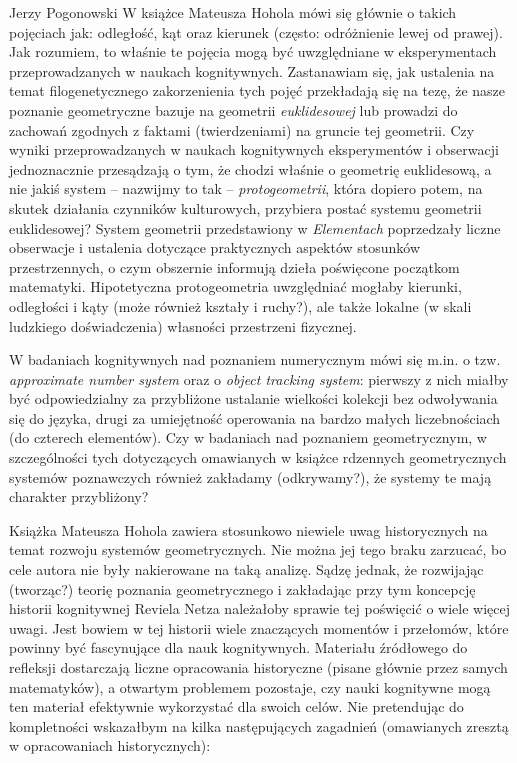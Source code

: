 \begin{newrevengenv}{Jerzy Pogonowski}
W książce Mateusza Hohola mówi się głównie o takich pojęciach jak:
odległość, kąt oraz kierunek (często: odróżnienie lewej od
prawej). Jak rozumiem, to właśnie te pojęcia mogą być uwzględniane
w eksperymentach przeprowadzanych w naukach kognitywnych.
Zastanawiam się, jak ustalenia na temat filogenetycznego
zakorzenienia tych pojęć przekładają się na tezę, że nasze
poznanie geometryczne bazuje na geometrii {\em euklidesowej} lub
prowadzi do zachowań zgodnych z faktami (twierdzeniami) na gruncie
tej geometrii. Czy wyniki przeprowadzanych w naukach kognitywnych
eksperymentów i obserwacji jednoznacznie przesądzają o tym, że
chodzi właśnie o geometrię euklidesową, a nie jakiś system --
nazwijmy to tak -- {\em protogeometrii}, która dopiero potem, na
skutek działania czynników kulturowych, przybiera postać systemu
geometrii euklidesowej? System geometrii przedstawiony w {\em
Elementach} poprzedzały liczne obserwacje i ustalenia dotyczące
praktycznych aspektów stosunków przestrzennych, o czym obszernie
informują dzieła poświęcone początkom matematyki. Hipotetyczna
protogeometria uwzględniać mogłaby kierunki, odległości i kąty
(może również kształy i ruchy?), ale także lokalne (w skali
ludzkiego doświadczenia) własności przestrzeni fizycznej.

W badaniach kognitywnych nad poznaniem numerycznym mówi się m.in.
o tzw. {\em approximate number system} oraz o {\em object tracking
system}: pierwszy z nich miałby być odpowiedzialny za przybliżone
ustalanie wielkości kolekcji bez odwoływania się do języka, drugi
za umiejętność operowania na bardzo małych liczebnościach (do
czterech elementów). Czy w badaniach nad poznaniem geometrycznym,
w szczególności tych dotyczących omawianych w książce rdzennych
geometrycznych systemów poznawczych również zakładamy
(odkrywamy?), że systemy te mają charakter przybliżony?

Książka Mateusza Hohola zawiera stosunkowo niewiele uwag
historycznych na temat rozwoju systemów geometrycznych. Nie można
jej tego braku zarzucać, bo cele autora nie były nakierowane na
taką analizę. Sądzę jednak, że rozwijając (tworząc?) teorię
poznania geometrycznego i zakładając przy tym koncepcję historii
kognitywnej Reviela Netza należałoby sprawie tej poświęcić o wiele
więcej uwagi. Jest bowiem w tej historii wiele znaczących momentów
i przełomów, które powinny być fascynujące dla nauk kognitywnych.
Materiału źródłowego do refleksji dostarczają liczne opracowania
historyczne (pisane głównie przez samych matematyków), a otwartym
problemem pozostaje, czy nauki kognitywne mogą ten materiał
efektywnie wykorzystać dla swoich celów. Nie pretendując do
kompletności wskazałbym na kilka następujących zagadnień
(omawianych zresztą w opracowaniach historycznych):


\end{newrevengenv}
